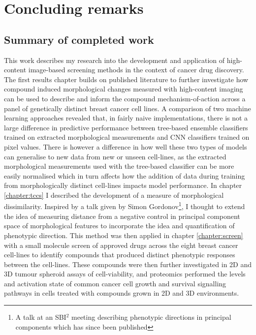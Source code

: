 \documentclass[a4paper,11pt,twoside,openright]{scrbook}
\begin{document}
\chapter{Concluding remarks} \label{chapter:discussionAndConclusion}

\section{Summary of completed work}

This work describes my research into the development and application of high-content image-based screening methods in 
the context of cancer drug discovery.
The first results chapter builds on published literature to further investigate how compound induced morphological 
changes measured with high-content imaging can be used to describe and inform the compound mechanism-of-action across a 
panel of genetically distinct breast cancer cell lines.
A comparison of two machine learning approaches revealed that, in fairly naive implementations, there is not a large 
difference in predictive performance between tree-based ensemble classifiers trained on extracted morphological 
measurements and CNN classifiers trained on pixel values.
There is however a difference in how well these two types of models can generalise to new data from new or unseen 
cell-lines, as the extracted morphological measurements used with the tree-based classifier can be more easily 
normalised which in turn affects how the addition of data during training from morphologically distinct cell-lines 
impacts model performance.
In chapter \ref{chapter:tccs} I described the development of a measure of morphological dissimilarity.
Inspired by a talk given by Simon Gordonov\footnote{A talk at an SBI$^2$ meeting describing phenotypic directions in 
principal components which has since been published\cite{Gordonov2016}}, I thought to extend the idea of measuring 
distance from a negative control in principal component space of morphological features to incorporate the idea and 
quantification of phenotypic direction.
This method was then applied in chapter \ref{chapter:screen} with a small molecule screen of approved drugs across the 
eight breast cancer cell-lines to identify compounds that produced distinct phenotypic responses between the cell-lines.
These compounds were then further investigated in 2D and 3D tumour spheroid assays of cell-viability, and proteomics 
performed the levels and activation state of common cancer cell growth and survival signalling pathways in cells 
treated with compounds grown in 2D and 3D environments.
\end{document}
